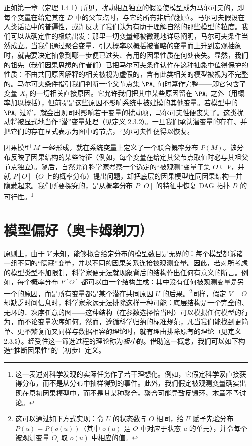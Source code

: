 正如第一章（定理 1.4.1）所见，扰动相互独立的假设使模型成为马尔可夫的，即每个变量在给定其在 $D$ 中的父节点时，与它的所有非后代独立。马尔可夫假设在人类话语中的普遍性，或许反映了我们认为有助于理解自然的那些模型的粒度。我们可以从确定性的极端出发：那里一切变量都被微观地详尽阐明，马尔可夫条件当然成立。当我们通过聚合变量、引入概率以概括被省略的变量而上升到宏观抽象时，就需要决定抽象到哪一步便已过头、有用的因果性质在何处丧失。显然，我们的祖先（我们因果思想的作者们）已把马尔可夫条件认作在这种抽象中值得保护的性质：不由共同原因解释的相关被视为虚假的，含有此类相关的模型被视为不完整的。马尔可夫条件指引我们判断一个父节点集 $\PA_i$ 何时算作完整——即它包含了变量 $X_i$ 的一切相关直接原因。它允许我们把其中某些原因留在 $\PA_i$ 之外（用概率加以概括），但前提是这些原因不影响系统中被建模的其他变量。若模型中的 $\PA_i$ 过窄，就会出现同时影响若干变量的扰动项，马尔可夫性便丧失了。这类扰动将被显式地当作“潜”变量处理（见定义 2.3.2）。一旦我们承认潜变量的存在、并把它们的存在显式表示为图中的节点，马尔可夫性便得以恢复。

因果模型 $M$ 一经形成，就在系统变量上定义了一个联合概率分布 $P(M)$。该分布反映了因果结构的某些特征（例如，每个变量在给定其父节点取值时必与其祖父节点独立）。随后，自然允许科学家考察一个选定的“被观测”变量子集 $O\subseteq V$，并就 $P[O]$（$O$ 上的概率分布）提出问题，却把底层的因果模型连同因果结构一并隐藏起来。我们所要探究的，是从概率分布 $P[O]$ 的特征中恢复 DAG 拓扑 $D$ 的可行性。\footnote{这一表述对科学发现的实际任务作了若干理想化。例如，它假定科学家直接获得分布，而不是从分布中抽样得到的事件。此外，我们假定被观测变量确实出现在原初因果模型中，而不是其某种聚合。聚合可能导致反馈环，本章不予讨论。}

\section{模型偏好（奥卡姆剃刀）}

原则上，由于 $V$ 未知，能够拟合给定分布的模型数目是无界的：每个模型都诉诸一组不同的“隐藏”变量，并以不同的因果关系连接被观测变量。因此，若对所考虑的模型类型不加限制，科学家便无法就现象背后的结构作出任何有意义的断言。例如，每个概率分布 $P[O]$ 都可以由一个结构生成：其中没有任何被观测变量是另一个的原因，而是所有变量都是某个潜在共同原因 $U$ 的后果。\footnote{这可以通过如下方式实现：令 $U$ 的状态数与 $O$ 相同，给 $U$ 赋予先验分布 $P(u)=P(o(u))$（其中 $o(u)$ 是 $O$ 中对应于状态 $u$ 的单元），并令每个被观测变量 $O_i$ 取 $o(u)$ 中相应的值。}同样，假定 $V=O$ 却缺乏时间信息时，科学家永远无法排除这样一种可能：底层结构是一个完全的、无环的、次序任意的图——这种结构（在参数选择恰当时）可以模拟任何模型的行为，而不论变量次序如何。然而，遵循科学归纳的标准规范，凡当我们能找到更简单、更不繁复而又同样与数据相容的理论时，就有理由排除原有的理论（见定义 2.3.5）。经受住这一筛选过程的理论称为\emph{极小}的。借助这一概念，我们可以如下构造“推断因果性”的（初步）定义。


